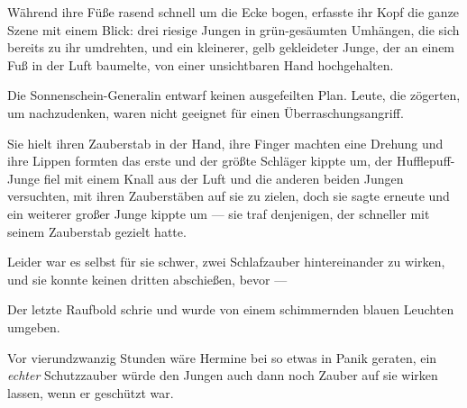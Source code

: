 Während ihre Füße rasend schnell um die Ecke bogen, erfasste ihr Kopf die ganze Szene mit einem Blick: drei riesige Jungen in grün-gesäumten Umhängen, die sich bereits zu ihr umdrehten, und ein kleinerer, gelb gekleideter Junge, der an einem Fuß in der Luft baumelte, von einer unsichtbaren Hand hochgehalten.

Die Sonnenschein-Generalin entwarf keinen ausgefeilten Plan. Leute, die zögerten, um nachzudenken, waren nicht geeignet für einen Überraschungsangriff.

Sie hielt ihren Zauberstab in der Hand, ihre Finger machten eine Drehung und ihre Lippen formten das erste  und der größte Schläger kippte um, der Hufflepuff-Junge fiel mit einem Knall aus der Luft und die anderen beiden Jungen versuchten, mit ihren Zauberstäben auf sie zu zielen, doch sie sagte erneute  und ein weiterer großer Junge kippte um — sie traf denjenigen, der schneller mit seinem Zauberstab gezielt hatte.

Leider war es selbst für sie schwer, zwei Schlafzauber hintereinander zu wirken, und sie konnte keinen dritten abschießen, bevor —

Der letzte Raufbold schrie  und wurde von einem schimmernden blauen Leuchten umgeben.

Vor vierundzwanzig Stunden wäre Hermine bei so etwas in Panik geraten, ein \emph{echter} Schutzzauber würde den Jungen auch dann noch Zauber auf sie wirken lassen, wenn er geschützt war.

